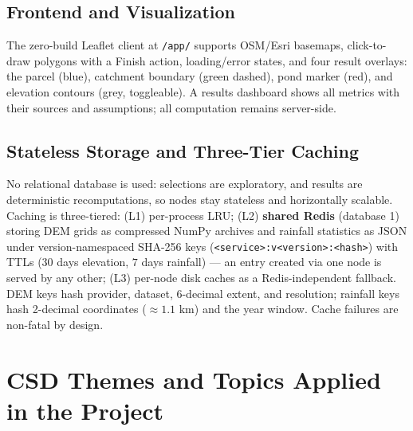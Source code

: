 \documentclass[manuscript,screen,review]{acmart}
\begin{document}
\subsection{Frontend and Visualization}
The zero-build Leaflet client at \texttt{/app/} supports OSM/Esri basemaps, click-to-draw polygons with a Finish action, loading/error states, and four result overlays: the parcel (blue), catchment boundary (green dashed), pond marker (red), and elevation contours (grey, toggleable). A results dashboard shows all metrics with their sources and assumptions; all computation remains server-side.

\subsection{Stateless Storage and Three-Tier Caching}
No relational database is used: selections are exploratory, and results are deterministic recomputations, so nodes stay stateless and horizontally scalable. Caching is three-tiered: (L1) per-process LRU; (L2) \textbf{shared Redis} (database 1) storing DEM grids as compressed NumPy archives and rainfall statistics as JSON under version-namespaced SHA-256 keys (\texttt{<service>:v<version>:<hash>}) with TTLs ($30$ days elevation, $7$ days rainfall) --- an entry created via one node is served by any other; (L3) per-node disk caches as a Redis-independent fallback. DEM keys hash provider, dataset, 6-decimal extent, and resolution; rainfall keys hash 2-decimal coordinates ($\approx 1.1\text{ km}$) and the year window. Cache failures are non-fatal by design.

\section{CSD Themes and Topics Applied in the Project}
\label{sec:csd-themes}
\end{document}

